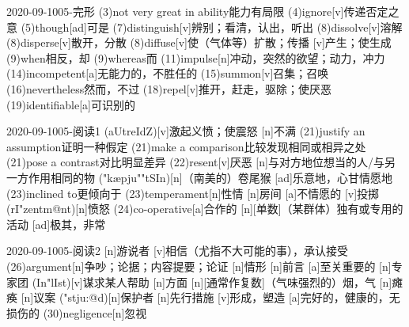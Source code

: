 \documentclass[12pt]{ctexart}
\begin{document}
\begin{wordlist}{2020-09-10}{05-完形}
  \word(3){not very great in ability}{能力有局限}
  \word(4){ignore}[v]{传递否定之意}
  \word(5){though}[ad]{可是}
  \word(7){distinguish}[v]{辨别；看清，认出，听出}
  \word(8){dissolve}[v]{溶解}
  \word[2020-09-17](8){disperse}[v]{散开，分散}
  \word[2020-10-16](8){diffuse}[v]{使（气体等）扩散；传播}
  [v]{产生；使生成}
  \word(9){when}{相反，却}
  \word(9){whereas}{而}
  \word(11){impulse}[n]{冲动，突然的欲望；动力，冲力}
  \word(14){incompetent}[a]{无能力的，不胜任的}
  \word(15){summon}[v]{召集；召唤}
  \word(16){nevertheless}{然而，不过}
  \word[2020-09-14](18){repel}[v]{推开，赶走，驱除；使厌恶}
  \word(19){identifiable}[a]{可识别的}
\end{wordlist}
\begin{wordlist}{2020-09-10}{05-阅读1}
  (aUtreIdZ)[v]{激起义愤；使震怒}
  [n]{不满}
  \word(21){justify an assumption}{证明一种假定}
  \word(21){make a comparison}{比较发现相同或相异之处}
  \word(21){pose a contrast}{对比明显差异}
  \word[2020-09-12](22){resent}[v]{厌恶}
  [n]{与对方地位想当的人/与另一方作用相同的物}
  ("k\ae pju""tSIn)[n]{（南美的）卷尾猴}
  [ad]{乐意地，心甘情愿地}
  \word(23){inclined to}{更倾向于}
  \word[2020-09-12](23){temperament}[n]{性情}
  [n]{房间}
  [a]{不情愿的}
  [v]{投掷}
  (rI"zentm@nt)[n]{愤怒}
  \word(24){co-operative}[a]{合作的}
  [n]{[单数]（某群体）独有或专用的活动}
  [ad]{极其，非常}
\end{wordlist}
\begin{wordlist}{2020-09-10}{05-阅读2}
  [n]{游说者}
  [v]{相信（尤指不大可能的事），承认接受}
  \word(26){argument}[n]{争吵；论据；内容提要；论证}
  [n]{情形}
  [n]{前言}
  [a]{至关重要的}
  [n]{专家团}
  (In"lIst)[v]{谋求某人帮助}
  [n]{方面}
  [n]{[通常作复数]（气味强烈的）烟，气}
  [n]{瘫痪}
  [n]{议案}
  ("stju:@d)[n]{保护者}
  [n]{先行措施}
  [v]{形成，塑造}
  [a]{完好的，健康的，无损伤的}
  \word[2020-09-27](30){negligence}[n]{忽视}
\end{wordlist}
\end{document}
